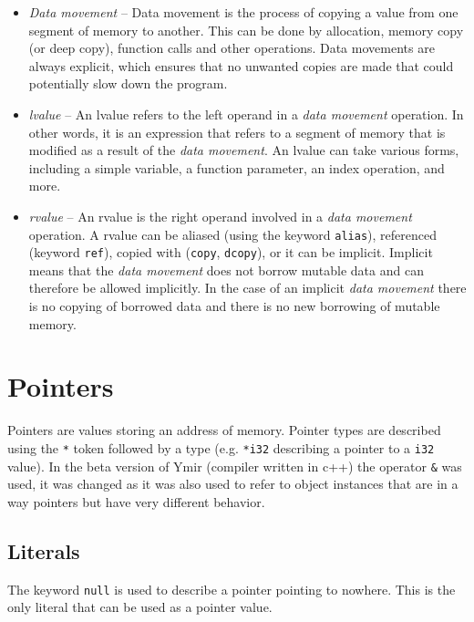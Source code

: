 \begin{itemize}
\item \textit{Data movement} -- Data movement is the process of copying a value
  from one segment of memory to another. This can be done by allocation, memory
  copy (or deep copy), function calls and other operations. Data movements are
  always explicit, which ensures that no unwanted copies are made that could
  potentially slow down the program.

\item \textit{lvalue} -- An lvalue refers to the left operand in a \textit{data
  movement} operation. In other words, it is an expression that refers to a
  segment of memory that is modified as a result of the \textit{data movement}.
  An lvalue can take various forms, including a simple variable, a function
  parameter, an index operation, and more.

\item \textit{rvalue} -- An rvalue is the right operand involved in a
  \textit{data movement} operation. A rvalue can be aliased (using the keyword
  \texttt{alias}), referenced (keyword \texttt{ref}), copied with
  (\texttt{copy}, \texttt{dcopy}), or it can be implicit. Implicit means that
  the \textit{data movement} does not borrow mutable data and can therefore be
  allowed implicitly. In the case of an implicit \textit{data movement} there is
  no copying of borrowed data and there is no new borrowing of mutable memory.

\end{itemize}

\section{Pointers}%
\label{sec:pointer_type}

Pointers are values storing an address of memory. Pointer types are described
using the \texttt{*} token followed by a type (e.g. \texttt{*i32} describing a
pointer to a \texttt{i32} value). In the beta version of Ymir (compiler written
in c++) the operator \texttt{\&} was used, it was changed as it was also used to
refer to object instances that are in a way pointers but have very different
behavior.

\subsection {Literals}

The keyword \texttt{null} is used to describe a pointer pointing to nowhere.
This is the only literal that can be used as a pointer value.


